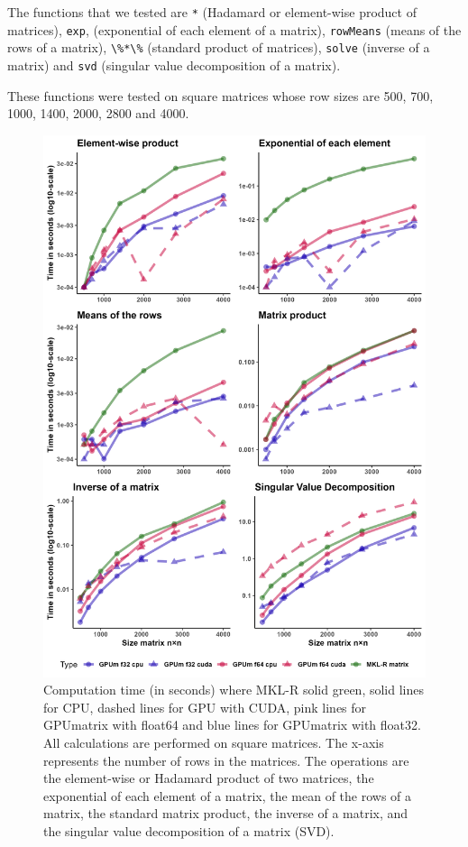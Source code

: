 The functions that we tested are \texttt{*} (Hadamard or element-wise product of matrices), \texttt{exp}, (exponential of each element of a matrix), \texttt{rowMeans} (means of the rows of a matrix), \texttt{\textbackslash{}\%*\textbackslash{}\%} (standard product of matrices), \texttt{solve} (inverse of a matrix) and \texttt{svd} (singular value decomposition of a matrix).

These functions were tested on square matrices whose row sizes are 500, 700, 1000, 1400, 2000, 2800 and 4000.

\begin{figure}
\includegraphics[width=1\linewidth,height=0.8\textheight]{figures/performanceComparison} \caption{Computation time (in seconds) where MKL-R solid green, solid lines for CPU, dashed lines for GPU with CUDA, pink lines for GPUmatrix with float64 and blue lines for GPUmatrix with float32. All calculations are performed on square matrices. The x-axis represents the number of rows in the matrices. The operations are the element-wise or Hadamard product of two matrices, the exponential of each element of a matrix, the mean of the rows of a matrix, the standard matrix product, the inverse of a matrix, and the singular value decomposition of a matrix (SVD).}\label{fig:FunctionTime}
\end{figure}

